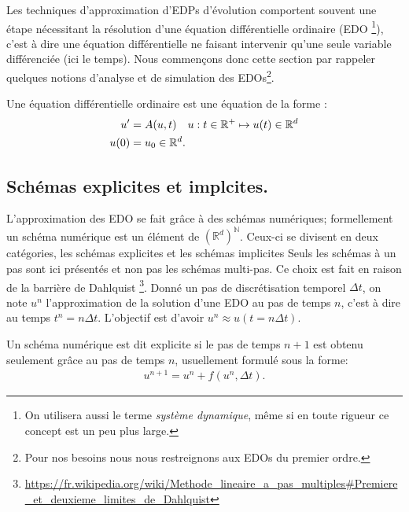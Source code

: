 Les techniques d'approximation d'EDPs d'évolution comportent souvent une étape nécessitant la résolution d'une équation différentielle ordinaire (EDO
\footnote{On utilisera aussi le terme \textit{système dynamique}, même si en toute rigueur ce concept est un peu plus large.}),
c'est à dire une équation différentielle ne faisant intervenir qu'une seule variable différenciée (ici le temps). Nous commençons donc cette section par rappeler 
quelques notions d'analyse et de simulation des EDOs\footnote{Pour nos besoins nous nous restreignons aux EDOs du premier ordre.}.\par

\begin{definition}
    Une équation différentielle ordinaire est une équation de la forme :
    \begin{align}\label{def:def_ODE}
        u' &= A(u,t)\quad u : t \in \mathbb{R}^+ \mapsto u(t) \in \mathbb{R}^d\\\notag
        u(0)&=u_0 \in \mathbb{R}^d.
    \end{align}
\end{definition}
\subsection{Schémas explicites et implcites.}
L'approximation des EDO se fait grâce à des schémas numériques; formellement un schéma numérique est un élément de $(\mathbb{R}^d)^\mathbb{N}$. 
Ceux-ci se divisent en deux catégories, les schémas explicites et les schémas implicites
Seuls les schémas à un pas sont ici présentés et non pas les schémas multi-pas. Ce choix est fait en raison de la barrière de Dahlquist
\footnote{\url{https://fr.wikipedia.org/wiki/Methode_lineaire_a_pas_multiples\#Premiere_et_deuxieme_limites_de_Dahlquist}}.
Donné un pas de discrétisation temporel $\Delta t$, on note $u^n$ l'approximation de la solution d'une EDO au pas de temps $n$, c'est à dire au temps $t^n = n \Delta t$.
L'objectif est d'avoir $u^n \approx u(t=n\Delta t)$.

\begin{definition}
    Un schéma numérique est dit explicite si le pas de temps $n+1$ est obtenu seulement grâce au pas de temps $n$, usuellement formulé sous la forme:
    \begin{align}
        u^{n+1} = u^n + f(u^n ,\Delta t ).
    \end{align}
\end{definition}

